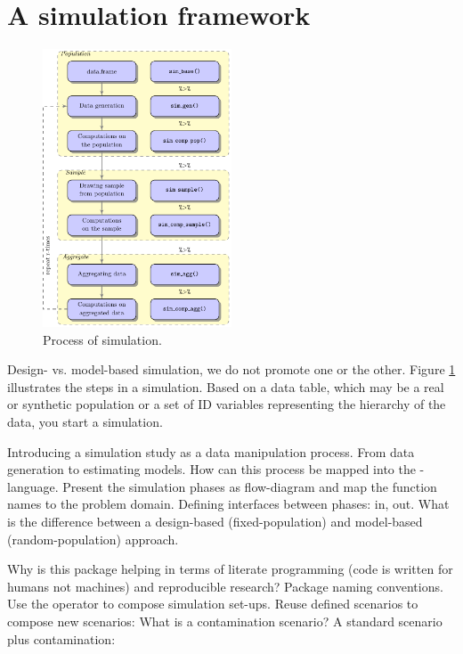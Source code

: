 \documentclass[article]{ajs}
\begin{document}
\section{A simulation framework}

\begin{figure}
\begin{center}
\includegraphics[width=0.5\textwidth]{flowdiagram}
\end{center}
\caption{\label{fig:flowdiagram}Process of simulation.} 
\end{figure}

Design- vs. model-based simulation, we do not promote one or the other. 
Figure \ref{fig:flowdiagram} illustrates the steps in a simulation. Based on a data table, which may be a real or synthetic population or a set of ID variables representing the hierarchy of the data, you start a simulation.

Introducing a simulation study as a data manipulation process. From data generation to estimating models. How can this process be mapped into the -language. Present the simulation phases as flow-diagram and map the function names to the problem domain. Defining interfaces between phases:  in,  out. What is the difference between a design-based (fixed-population) and model-based (random-population) approach. 

Why is this package helping in terms of literate programming (code is written for humans not machines) and reproducible research? Package naming conventions. Use the \proglang{\%>\%} operator to compose simulation set-ups. Reuse defined scenarios to compose new scenarios: What is a contamination scenario? A standard scenario plus contamination:
\end{document}
